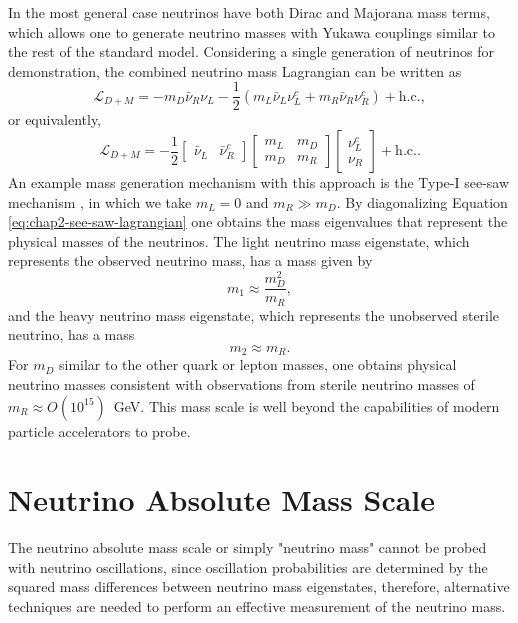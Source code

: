In the most general case neutrinos have both Dirac and Majorana mass terms, which allows one to generate neutrino masses with Yukawa couplings similar to the rest of the standard model. Considering a single generation of neutrinos for demonstration, the combined neutrino mass Lagrangian can be written as 
\begin{equation}
    \mathcal{L}_{D+M}=-m_D\bar{\nu}_{R}\nu_{L} - \frac{1}{2}(m_L\bar{\nu}_L\nu_L^c+m_R\bar{\nu}_R\nu_R^c)+\text{h.c.},
\end{equation}
or equivalently,
\begin{equation}
    \label{eq:chap2-see-saw-lagrangian}
    \mathcal{L}_{D+M}=-\frac{1}{2}\begin{bmatrix}\bar{\nu}_L&\bar{\nu}^c_R\end{bmatrix}\begin{bmatrix}m_L&m_D\\m_D&m_R\end{bmatrix}\begin{bmatrix}\nu^c_L\\ \nu_R\end{bmatrix} + \text{h.c.}.
\end{equation}
An example mass generation mechanism with this approach is the Type-I see-saw mechanism \cite{numass_models_seesaw}, in which we take $m_L=0$ and $m_R\gg m_D$. By diagonalizing Equation \ref{eq:chap2-see-saw-lagrangian} one obtains the mass eigenvalues that represent the physical masses of the neutrinos. The light neutrino mass eigenstate, which represents the observed neutrino mass, has a mass given by
\begin{equation}
    m_1\approx\frac{m_D^2}{m_R},
\end{equation}
and the heavy neutrino mass eigenstate, which represents the unobserved sterile neutrino, has a mass
\begin{equation}
    m_2\approx m_R.
\end{equation}
For $m_D$ similar to the other quark or lepton masses, one obtains physical neutrino masses consistent with observations from sterile neutrino masses of $m_R\approx O(10^{15})$~GeV. This mass scale is well beyond the capabilities of modern particle accelerators to probe. 

\section{Neutrino Absolute Mass Scale}
\label{sec:chap2-nu-mass-scale}

The neutrino absolute mass scale or simply "neutrino mass" cannot be probed with neutrino oscillations, since oscillation probabilities are determined by the squared mass differences between neutrino mass eigenstates, therefore, alternative techniques are needed to perform an effective measurement of the neutrino mass.

